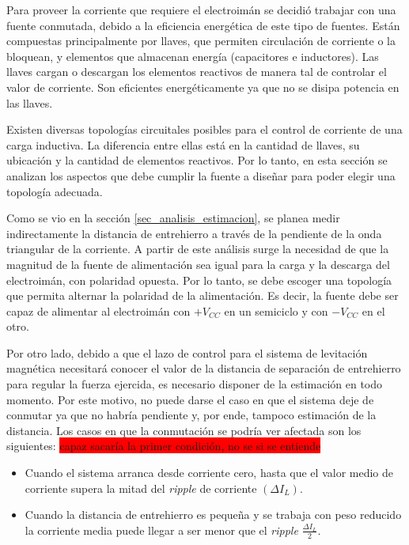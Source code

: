 Para proveer la corriente que requiere el electroimán se decidió trabajar con una fuente conmutada, debido a la eficiencia energética de este tipo de fuentes. Están compuestas principalmente por llaves, que permiten circulación de corriente o la bloquean, y elementos que almacenan energía (capacitores e inductores). Las llaves cargan o descargan los elementos reactivos de manera tal de controlar el valor de corriente. Son eficientes energéticamente ya que no se disipa potencia en las llaves.

Existen diversas topologías circuitales posibles para el control de corriente de una carga inductiva. La diferencia entre ellas está en la cantidad de llaves, su ubicación y la cantidad de elementos reactivos. Por lo tanto, en esta sección se analizan los aspectos que debe cumplir la fuente a diseñar para poder elegir una topología adecuada.

Como se vio en la sección \ref{sec_analisis_estimacion}, se planea medir indirectamente la distancia de entrehierro a través de la pendiente de la onda triangular de la corriente. A partir de este análisis surge la necesidad de que la magnitud de la fuente de alimentación sea igual para la carga y la descarga del electroimán, con polaridad opuesta. Por lo tanto, se debe escoger una topología que permita alternar la polaridad de la alimentación. Es decir, la fuente debe ser capaz de alimentar al electroimán con $+V_{CC}$  en un semiciclo y con $-V_{CC}$ en el otro.

Por otro lado, debido a que el lazo de control para el sistema de levitación magnética necesitará conocer el valor de la distancia de separación de entrehierro para regular la fuerza ejercida, es necesario disponer de la estimación en todo momento. Por este motivo, no puede darse el caso en que el sistema deje de conmutar ya que no habría pendiente y, por ende, tampoco estimación de la distancia. Los casos en que la conmutación se podría ver afectada son los siguientes: 
\colorbox{red}{capaz sacaría la primer condición, no se si se entiende}
\begin{itemize} 
	\item Cuando el sistema arranca desde corriente cero, hasta que el valor medio de corriente supera la mitad del \textsl{ripple} de corriente $(\Delta I_{L})$.
	
	\item Cuando la distancia de entrehierro es pequeña y se trabaja con peso reducido la corriente media puede llegar a ser menor que el \textsl{ripple} $\frac{\Delta I_{L}}{2}$.
\end{itemize}

